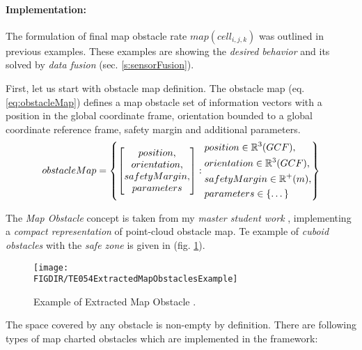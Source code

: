 \paragraph{Implementation:} The formulation of final map obstacle rate  $map(cell_{i,j,k})$ was outlined in previous examples. These examples are showing the \emph{desired behavior} and its solved by \emph{data fusion} (sec. \ref{s:sensorFusion}).

First, let us start with obstacle map definition. The obstacle map  (eq. \ref{eq:obstacleMap}) defines a map obstacle set of information vectors with a position in the global coordinate frame, orientation bounded to a global coordinate reference frame, safety margin and additional parameters.
\begin{equation}\label{eq:obstacleMap}
    obstacle Map= 
    \left\{
    \begin{bmatrix}
        position,\\
        orientation,\\
        safety Margin,\\
        parameters
    \end{bmatrix}
    :
    \begin{aligned}
        & position \in  \mathbb{R}^3(GCF),\\
        & orientation \in \mathbb{R}^3(GCF),\\
        & safety Margin \in \mathbb{R}^+(m),\\
        & parameters \in \{\dots\}
    \end{aligned}
    \right\}
\end{equation}


The \emph{Map Obstacle} concept is taken from my \emph{master student work} \cite{cernamaria2018}, implementing a \emph{compact representation} of point-cloud obstacle map. Te example of \emph{cuboid obstacles} with the \emph{safe zone} is given in (fig. \ref{fig:exampleExtractedMapObstacles}).
    
\begin{figure}[H]
    \centering
    \texttt{[image: \\FIGDIR/TE054ExtractedMapObstaclesExample]}
    \caption{Example of Extracted Map Obstacle \cite{cernamaria2018}.}
    \label{fig:exampleExtractedMapObstacles}
\end{figure} 

\noindent The space covered by any obstacle  is non-empty by definition. There are following types of map charted obstacles which are implemented in the framework:

